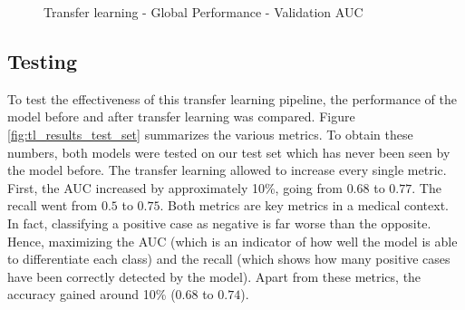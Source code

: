 
\begin{figure}[!h]
\centering
\noindent
{}
\caption{Transfer learning - Global Performance - Validation AUC}
\label{fig:tl_global_validation_auc.png}
\end{figure}




\subsection{Testing}
To test the effectiveness of this transfer learning pipeline, the performance of the model before and after transfer learning was compared. Figure \ref{fig:tl_results_test_set} summarizes the various metrics. To obtain these numbers, both models were tested on our test set which has never been seen by the model before. The transfer learning allowed to increase every single metric. First, the AUC increased by approximately 10\%, going from $0.68$ to $0.77$. The recall went from $0.5$ to $0.75$. Both metrics are key metrics in a medical context. In fact, classifying a positive case as negative is far worse than the opposite. Hence, maximizing the AUC (which is an indicator of how well the model is able to differentiate each class) and the recall (which shows how many positive cases have been correctly detected by the model). Apart from these metrics, the accuracy gained around 10\% ($0.68$ to $0.74$). 


